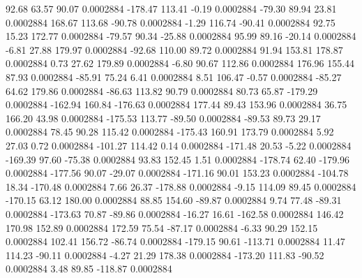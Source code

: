        92.68       63.57       90.07     0.0002884
     -178.47      113.41       -0.19     0.0002884
      -79.30       89.94       23.81     0.0002884
      168.67      113.68      -90.78     0.0002884
       -1.29      116.74      -90.41     0.0002884
       92.75       15.23      172.77     0.0002884
      -79.57       90.34      -25.88     0.0002884
       95.99       89.16      -20.14     0.0002884
       -6.81       27.88      179.97     0.0002884
      -92.68      110.00       89.72     0.0002884
       91.94      153.81      178.87     0.0002884
        0.73       27.62      179.89     0.0002884
       -6.80       90.67      112.86     0.0002884
      176.96      155.44       87.93     0.0002884
      -85.91       75.24        6.41     0.0002884
        8.51      106.47       -0.57     0.0002884
      -85.27       64.62      179.86     0.0002884
      -86.63      113.82       90.79     0.0002884
       80.73       65.87     -179.29     0.0002884
     -162.94      160.84     -176.63     0.0002884
      177.44       89.43      153.96     0.0002884
       36.75      166.20       43.98     0.0002884
     -175.53      113.77      -89.50     0.0002884
      -89.53       89.73       29.17     0.0002884
       78.45       90.28      115.42     0.0002884
     -175.43      160.91      173.79     0.0002884
        5.92       27.03        0.72     0.0002884
     -101.27      114.42        0.14     0.0002884
     -171.48       20.53       -5.22     0.0002884
     -169.39       97.60      -75.38     0.0002884
       93.83      152.45        1.51     0.0002884
     -178.74       62.40     -179.96     0.0002884
     -177.56       90.07      -29.07     0.0002884
     -171.16       90.01      153.23     0.0002884
     -104.78       18.34     -170.48     0.0002884
        7.66       26.37     -178.88     0.0002884
       -9.15      114.09       89.45     0.0002884
     -170.15       63.12      180.00     0.0002884
       88.85      154.60      -89.87     0.0002884
        9.74       77.48      -89.31     0.0002884
     -173.63       70.87      -89.86     0.0002884
      -16.27       16.61     -162.58     0.0002884
      146.42      170.98      152.89     0.0002884
      172.59       75.54      -87.17     0.0002884
       -6.33       90.29      152.15     0.0002884
      102.41      156.72      -86.74     0.0002884
     -179.15       90.61     -113.71     0.0002884
       11.47      114.23      -90.11     0.0002884
       -4.27       21.29      178.38     0.0002884
     -173.20      111.83      -90.52     0.0002884
        3.48       89.85     -118.87     0.0002884
